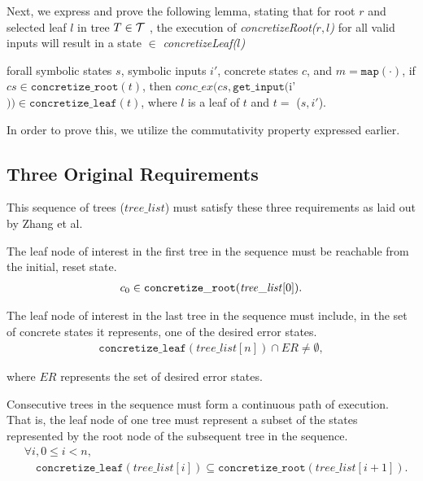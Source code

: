 Next, we express and prove the following lemma, stating that for root $r$ and selected leaf $l$ in tree $T \in \mathcal{T}$ , the execution of \emph{concretizeRoot($r,l$)} for all valid inputs will result in a state $\in$  \emph{concretizeLeaf($l$)}
\begin{lemma} \label{cop}
forall symbolic states $s$, symbolic inputs $i'$, concrete states $c$, and $m = \mathtt{map(\cdot)}$,
if $cs \in \mathtt{concretize\_root}(t)$,
then 
$conc\_ex(cs, \mathtt{get\_input} ($i'$)) \in \mathtt{concretize\_leaf}(t)$,
where $l$ is a leaf of $t$ and $t = $ \symexecution($s, i'$).
\end{lemma}

In order to prove this, we utilize the commutativity property expressed earlier.

\subsection{Three Original Requirements} This sequence of trees ($\mathit{tree\_list}$)
must satisfy these three requirements as laid out by Zhang et al.
\setcounter{property}{0}
\renewcommand{\theproperty}{Z.\arabic{property}}
\begin{property}
  \label{prop:startinit} The leaf node of interest in the first tree in the
  sequence must be reachable from the initial, reset state.
  \begin{align*}
    c_0 \in \mathtt{concretize\_root}(\mathit{tree\_list}[0]).
  \end{align*}
\end{property}

\begin{property}
  \label{prop:enderror} The leaf node of interest in the last tree in the
  sequence must include, in the set of concrete states it represents, one of the
  desired error states. 
  \begin{align*}
    \mathtt{concretize\_leaf}(\mathit{tree\_list}[n]) \cap \mathit{ER} \neq
    \emptyset,
  \end{align*}
\end{property}
where $\mathit{ER}$ represents the set of desired error states.

\begin{property}
  \label{prop:stitch}
  Consecutive trees in the sequence must form a continuous path of
  execution. That is, the leaf node of one tree must represent a subset of the
  states represented by the root node of the subsequent tree in the sequence.
  \begin{align*}
    &\forall i, 0 \le i < n,\\
    &\quad\mathtt{concretize\_leaf}(\mathit{tree\_list}[i]) \subseteq
\mathtt{concretize\_root}(\mathit{tree\_list}[i+1]).
\end{align*}

\end{property}

